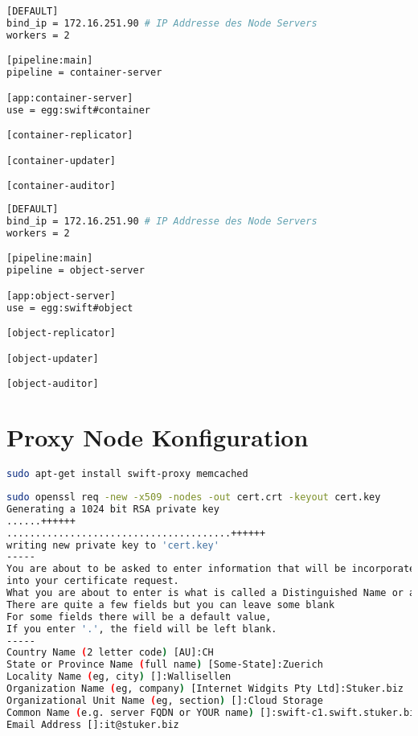 \begin{lstlisting}[label=container-server.conf, language=Bash, caption=Container Server in /etc/swift/container-server.conf konfigurieren]
[DEFAULT]
bind_ip = 172.16.251.90 # IP Addresse des Node Servers
workers = 2

[pipeline:main]
pipeline = container-server

[app:container-server]
use = egg:swift#container

[container-replicator]

[container-updater]

[container-auditor]
\end{lstlisting}


\begin{lstlisting}[label=object-server.conf, language=Bash, caption=Object Server in /etc/swift/object-server.conf konfigurieren]
[DEFAULT]
bind_ip = 172.16.251.90 # IP Addresse des Node Servers
workers = 2

[pipeline:main]
pipeline = object-server

[app:object-server]
use = egg:swift#object

[object-replicator]

[object-updater]

[object-auditor]
\end{lstlisting}

\section{Proxy Node Konfiguration}
\begin{lstlisting}[label=paketeProxy, language=Bash, caption=Installation Proxy-Node Pakete ]
sudo apt-get install swift-proxy memcached
\end{lstlisting}

\begin{lstlisting}[label=zertifikat, language=Bash, caption=X.509 Zertifikats in /etc/swift erstellen ]
sudo openssl req -new -x509 -nodes -out cert.crt -keyout cert.key
Generating a 1024 bit RSA private key
......++++++
.......................................++++++
writing new private key to 'cert.key'
-----
You are about to be asked to enter information that will be incorporated
into your certificate request.
What you are about to enter is what is called a Distinguished Name or a DN.
There are quite a few fields but you can leave some blank
For some fields there will be a default value,
If you enter '.', the field will be left blank.
-----
Country Name (2 letter code) [AU]:CH
State or Province Name (full name) [Some-State]:Zuerich
Locality Name (eg, city) []:Wallisellen
Organization Name (eg, company) [Internet Widgits Pty Ltd]:Stuker.biz
Organizational Unit Name (eg, section) []:Cloud Storage
Common Name (e.g. server FQDN or YOUR name) []:swift-c1.swift.stuker.biz
Email Address []:it@stuker.biz
\end{lstlisting}


